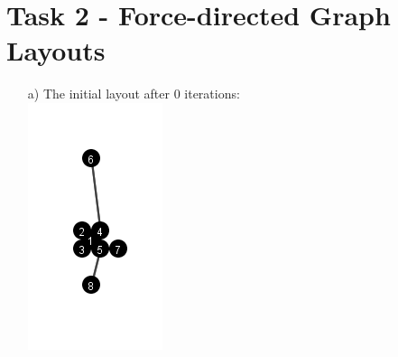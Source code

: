 \documentclass[a4paper]{article}
\begin{document}
\section*{Task 2 - Force-directed Graph Layouts}
\begin{enumerate}
	\item[a)]
	The initial layout after 0 iterations: \\
	\includegraphics{0.png}
	

\end{enumerate}
\end{document}
